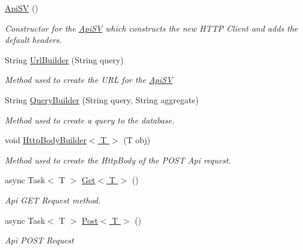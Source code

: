 \begin{DoxyCompactItemize}
\item 
\hyperlink{class_pocket_saver_1_1_services_1_1_api_s_v_ab265e3f79436f302dde76459b6fefa46}{Api\+SV} ()
\begin{DoxyCompactList}\small\item\em Constructor for the \hyperlink{class_pocket_saver_1_1_services_1_1_api_s_v}{Api\+SV} which constructs the new H\+T\+TP Client and adds the default headers. \end{DoxyCompactList}\item 
String \hyperlink{class_pocket_saver_1_1_services_1_1_api_s_v_aa770136ecefc3ae66bff6dc75670df45}{Url\+Builder} (String query)
\begin{DoxyCompactList}\small\item\em Method used to create the U\+RL for the \hyperlink{class_pocket_saver_1_1_services_1_1_api_s_v}{Api\+SV} \end{DoxyCompactList}\item 
String \hyperlink{class_pocket_saver_1_1_services_1_1_api_s_v_aa5064fcb4a18768820f20c39d75d4d44}{Query\+Builder} (String query, String aggregate)
\begin{DoxyCompactList}\small\item\em Method used to create a query to the database. \end{DoxyCompactList}\item 
void \hyperlink{class_pocket_saver_1_1_services_1_1_api_s_v_a88eb168469465c1fcba4c25ce00c0204}{Http\+Body\+Builder$<$ T $>$} (T obj)
\begin{DoxyCompactList}\small\item\em Method used to create the Http\+Body of the P\+O\+ST Api request. \end{DoxyCompactList}\item 
async Task$<$ T $>$ \hyperlink{class_pocket_saver_1_1_services_1_1_api_s_v_af0ad1db31c39565bc5e46d7ef1985fbb}{Get$<$ T $>$} ()
\begin{DoxyCompactList}\small\item\em Api G\+ET Request method. \end{DoxyCompactList}\item 
async Task$<$ T $>$ \hyperlink{class_pocket_saver_1_1_services_1_1_api_s_v_a4db27f4d8526c13b6227e36f40e609e3}{Post$<$ T $>$} ()
\begin{DoxyCompactList}\small\item\em Api P\+O\+ST Request \end{DoxyCompactList}\item 

\end{DoxyCompactItemize}

